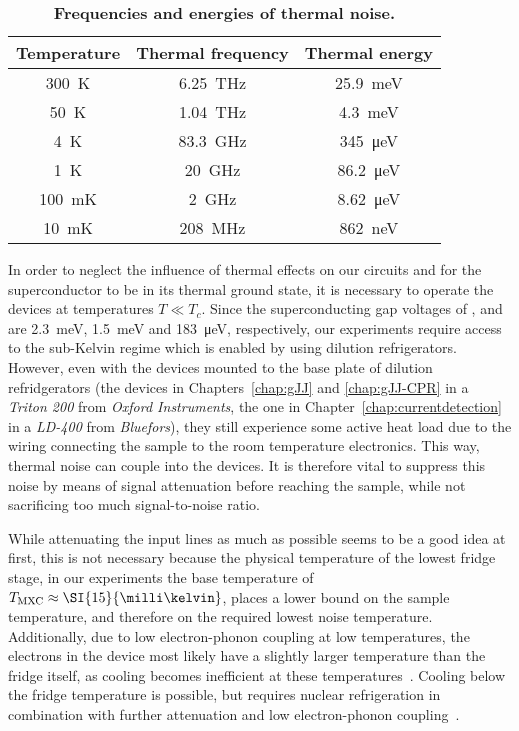 \begin{table}
	\caption{\textbf{Frequencies and energies of thermal noise.}}
	\label{tab:fthermal}
\begin{tabular}{ccc}
	\hline \hline
	Temperature & Thermal frequency & Thermal energy \\ 
	\hline 
	\SI{300}{\kelvin} & \SI{6.25}{\tera\hertz} & \SI{25.9}{\milli\electronvolt} \\ 
	\SI{50}{\kelvin} & \SI{1.04}{\tera\hertz} & \SI{4.3}{\milli\electronvolt} \\ 
	\SI{4}{\kelvin} & \SI{83.3}{\giga\hertz} & \SI{345}{\micro\electronvolt} \\ 
	\SI{1}{\kelvin} & \SI{20}{\giga\hertz} & \SI{86.2}{\micro\electronvolt} \\ 
	\SI{100}{\milli\kelvin} & \SI{2}{\giga\hertz} & \SI{8.62}{\micro\electronvolt} \\ 
	\SI{10}{\milli\kelvin} & \SI{208}{\mega\hertz} & \SI{862}{\nano\electronvolt} \\ 
	\hline \hline
\end{tabular}
\end{table}

In order to neglect the influence of thermal effects on our circuits and for the superconductor to be in its thermal ground state, it is necessary to operate the devices at temperatures $T \ll T_c$.
%
Since the superconducting gap voltages of ,  and  are \SI{2.3}{\milli\electronvolt}, \SI{1.5}{\milli\electronvolt} and \SI{183}{\micro\electronvolt}, respectively, our experiments require access to the sub-Kelvin regime which is enabled by using dilution refrigerators.
%
However, even with the devices mounted to the base plate of dilution refridgerators (the devices in Chapters~\ref{chap:gJJ} and \ref{chap:gJJ-CPR} in a \textit{Triton 200} from \textit{Oxford Instruments}, the one in Chapter~\ref{chap:currentdetection} in a \textit{LD-400} from \textit{Bluefors}), they still experience some active heat load due to the wiring connecting the sample to the room temperature electronics.
%
This way, thermal noise can couple into the devices.
%
It is therefore vital to suppress this noise by means of signal attenuation before reaching the sample, while not sacrificing too much signal-to-noise ratio.



While attenuating the input lines as much as possible seems to be a good idea at first, this is not necessary because the physical temperature of the lowest fridge stage, in our experiments the base temperature of $T_{\rm MXC}\approx\SI{15}{\milli\kelvin}$, places a lower bound on the sample temperature, and therefore on the required lowest noise temperature.
%
Additionally, due to low electron-phonon coupling at low temperatures, the electrons in the device most likely have a slightly larger temperature than the fridge itself, as cooling becomes inefficient at these temperatures~\cite{giazottoOpportunitiesMesoscopicsThermometry2006}.
%
Cooling below the fridge temperature is possible, but requires nuclear refrigeration in combination with further attenuation and low electron-phonon coupling~\cite{sarsby500MicrokelvinNanoelectronics2020}.
%

